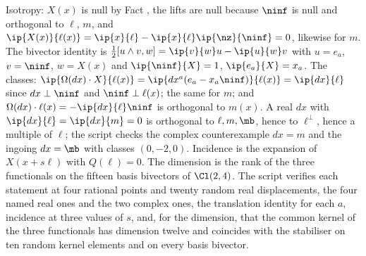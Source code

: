Isotropy: $X(x)$ is null by Fact , the lifts are null because $\ninf$ is null and orthogonal to $\ell$, $m$, and $\ip{X(x)}{\ell(x)} = \ip{x}{\ell} - \ip{x}{\ell}\ip{\nz}{\ninf} = 0$, likewise for $m$. The bivector identity is $\tfrac12[u\wedge v, w] = \ip{v}{w}u - \ip{u}{w}v$ with $u = e_{a}$, $v = \ninf$, $w = X(x)$ and $\ip{\ninf}{X} = 1$, $\ip{e_{a}}{X} = x_{a}$. The classes: $\ip{\Omega(dx)\cdot X}{\ell(x)} = \ip{dx^{a}(e_{a} - x_{a}\ninf)}{\ell(x)} = \ip{dx}{\ell}$ since $dx \perp \ninf$ and $\ninf \perp \ell(x)$; the same for $m$; and $\Omega(dx)\cdot\ell(x) = -\ip{dx}{\ell}\ninf$ is orthogonal to $m(x)$. A real $dx$ with $\ip{dx}{\ell} = \ip{dx}{m} = 0$ is orthogonal to $\ell, m, \mb$, hence to $\ell^{\perp}$, hence a multiple of $\ell$; the script checks the complex counterexample $dx = m$ and the ingoing $dx = \mb$ with classes $(0, -2, 0)$. Incidence is the expansion of $X(x + s\ell)$ with $Q(\ell) = 0$. The dimension is the rank of the three functionals on the fifteen basis bivectors of $\Cl(2,4)$. The script verifies each statement at four rational points and twenty random real displacements, the four named real ones and the two complex ones, the translation identity for each $a$, incidence at three values of $s$, and, for the dimension, that the common kernel of the three functionals has dimension twelve and coincides with the stabiliser on ten random kernel elements and on every basis bivector.
